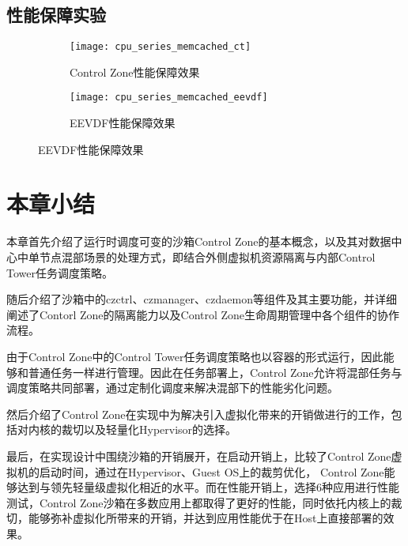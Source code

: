 \subsection{性能保障实验}



\begin{figure}[H]
    \centering
    \begin{subfigure}[b]{0.49\textwidth}
        \texttt{[image: cpu\_series\_memcached\_ct]}
        \caption{\quad Control Zone性能保障效果}
        \label{fig:cpu_series_memcached_ct}
    \end{subfigure}
    \begin{subfigure}[b]{0.49\textwidth}
        \texttt{[image: cpu\_series\_memcached\_eevdf]}
        \caption{\quad EEVDF性能保障效果}
        \label{fig:cpu_series_memcached_eevdf}
    \end{subfigure}
    \label{fig:cpu_series_memcached}
\end{figure}


\section{本章小结}

本章首先介绍了运行时调度可变的沙箱Control Zone的基本概念，以及其对数据中心中单节点混部场景的处理方式，即结合外侧虚拟机资源隔离与内部Control Tower任务调度策略。

随后介绍了沙箱中的czctrl、czmanager、czdaemon等组件及其主要功能，并详细阐述了Contorl Zone的隔离能力以及Control Zone生命周期管理中各个组件的协作流程。

由于Control Zone中的Control Tower任务调度策略也以容器的形式运行，因此能够和普通任务一样进行管理。因此在任务部署上，Control Zone允许将混部任务与调度策略共同部署，通过定制化调度来解决混部下的性能劣化问题。

然后介绍了Control Zone在实现中为解决引入虚拟化带来的开销做进行的工作，包括对内核的裁切以及轻量化Hypervisor的选择。

最后，在实现设计中围绕沙箱的开销展开，在启动开销上，比较了Control Zone虚拟机的启动时间，通过在Hypervisor、Guest OS上的裁剪优化， Control Zone能够达到与领先轻量级虚拟化相近的水平。而在性能开销上，选择6种应用进行性能测试，Control Zone沙箱在多数应用上都取得了更好的性能，同时依托内核上的裁切，能够弥补虚拟化所带来的开销，并达到应用性能优于在Host上直接部署的效果。